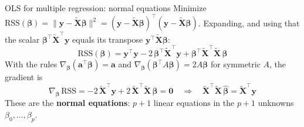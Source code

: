 \begin{frame}{OLS for multiple regression: normal equations}
    Minimize $\mathrm{RSS}(\symbf{\beta}) = \|\mathbf{y} - \tilde{\mathbf{X}} \symbf{\beta}\|^2 = (\mathbf{y} - \tilde{\mathbf{X}} \symbf{\beta})^\top (\mathbf{y} - \tilde{\mathbf{X}} \symbf{\beta})$. Expanding, and using that the scalar $\symbf{\beta}^\top \tilde{\mathbf{X}}^\top \mathbf{y}$ equals its transpose $\mathbf{y}^\top \tilde{\mathbf{X}} \symbf{\beta}$:
    \[
        \mathrm{RSS}(\symbf{\beta}) = \mathbf{y}^\top \mathbf{y} - 2\, \symbf{\beta}^\top \tilde{\mathbf{X}}^\top \mathbf{y} + \symbf{\beta}^\top \tilde{\mathbf{X}}^\top \tilde{\mathbf{X}}\, \symbf{\beta}
    \]
    With the rules $\nabla_{\symbf{\beta}} (\mathbf{a}^\top \symbf{\beta}) = \mathbf{a}$ and $\nabla_{\symbf{\beta}} (\symbf{\beta}^\top A \symbf{\beta}) = 2A\symbf{\beta}$ for symmetric $A$, the gradient is
    \[
        \nabla_{\symbf{\beta}}\, \mathrm{RSS} = -2\, \tilde{\mathbf{X}}^\top \mathbf{y} + 2\, \tilde{\mathbf{X}}^\top \tilde{\mathbf{X}}\, \symbf{\beta} = \mathbf{0} \quad \Longrightarrow \quad \tilde{\mathbf{X}}^\top \tilde{\mathbf{X}}\, \hat{\symbf{\beta}} = \tilde{\mathbf{X}}^\top \mathbf{y}
    \]
    These are the \textbf{normal equations}: $p+1$ linear equations in the $p+1$ unknowns $\beta_0, \dots, \beta_p$.
\end{frame}


